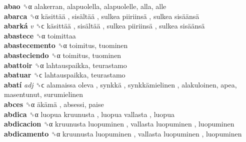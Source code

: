 \textbf{abao} ␝α  alakerran, alapuolella, alapuolelle, alla, alle  \\
\textbf{abarca} ␝α   käsittää ,  sisältää ,  sulkea piiriinsä ,  sulkea sisäänsä   \\
\textbf{abarká} \emph{v}  ␝ϲ   käsittää ,  sisältää ,  sulkea piiriinsä ,  sulkea sisäänsä   \\
\textbf{abastece} ␝α  toimittaa  \\
\textbf{abastecemento} ␝α  toimitus, tuominen  \\
\textbf{abasteciendo} ␝α  toimitus, tuominen  \\
\textbf{abattoir} ␝α  lahtauspaikka, teurastamo  \\
\textbf{abatuar} ␝ϲ  lahtauspaikka, teurastamo  \\
\textbf{abatí} \emph{adj}  ␝ϲ   alamaissa oleva ,  synkkä ,  synkkämielinen , alakuloinen, apea, masentunut, surumielinen  \\
\textbf{abces} ␝α   äkämä , absessi, paise  \\
\textbf{abdica} ␝α   luopua kruunusta ,  luopua vallasta , luopua  \\
\textbf{abdicacion} ␝α   kruunusta luopuminen ,  vallasta luopuminen , luopuminen  \\
\textbf{abdicamento} ␝α   kruunusta luopuminen ,  vallasta luopuminen , luopuminen  \\
